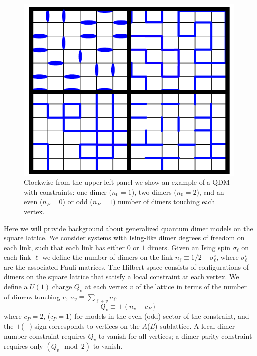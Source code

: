 \documentclass[twocolumn,prb,aps,floatfix,superscriptaddress]{revtex4-1}
\begin{document}
\begin{figure}[htpb]
    \centering
    \includegraphics[width=0.8\linewidth]{example_local_constraints.pdf}
    \caption{Clockwise from the upper left panel we show an example of a QDM with constraints: one
    dimer ($n_0 = 1$), two dimers ($n_0 = 2$), and an even ($n_P = 0$) or odd ($n_P = 1$) number of dimers touching each vertex.}
    \label{fig:example_local_constraints}
\end{figure}
Here we will provide background about generalized quantum dimer models on the square lattice. We consider systems with Ising-like dimer degrees of freedom on each link, such that each link has either $0$ or $1$ dimers. Given an Ising spin $\sigma_\ell$ on each link $\ell$ we define the number of dimers on the link $n_\ell \equiv 1/2+\sigma_\ell^z$, where $\sigma_\ell^i$ are the associated Pauli matrices. The Hilbert space consists of configurations of dimers on the square lattice that satisfy a local constraint at each vertex. We define a $U(1)$ charge $Q_v$ at each vertex $v$ of the lattice in terms of the number of dimers touching $v$, $n_v\equiv \sum_{\ell \in v}n_\ell$:
\begin{equation}
Q_v \equiv \pm \left( n_v - c_P \right)
\end{equation}
where $c_P = 2$, ($c_P=1$) for models in the even (odd) sector of the constraint, and the $+$($-$) sign corresponds to vertices on the $A$($B$) sublattice. A local dimer number constraint requires $Q_v$ to vanish for all vertices; a dimer parity constraint requires only $(Q_v\mod 2)$ to vanish.
 
\end{document}
